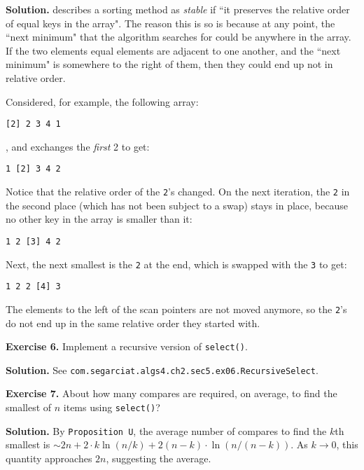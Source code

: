 \documentclass[12pt, a4paper]{article}
\newenvironment{ex}[2][Exercise]
{\par\medskip\noindent \textbf{#1 #2.}}
{\medskip}
\newenvironment{sol}[1][Solution]
{\par\medskip\noindent \textbf{#1.} }
{\medskip}
\begin{document}
	\begin{sol}
		\cite{sedgewick_wayne} describes a sorting method as \emph{stable}
		if ``it preserves the relative order of equal keys in the array".
		The reason this is so is because at any point, the ``next minimum"
		that the algorithm searches for could be anywhere in the array.
		If the two elements equal elements are adjacent to one another, and
		the ``next minimum" is somewhere to the right of them, then
		they could end up not in relative order.
		
		Considered, for example, the following array:
		\begin{lstlisting}[language={}]
[2] 2 3 4 1
		\end{lstlisting}, and exchanges the \emph{first} 2 to get:
		\begin{lstlisting}[language={}]
1 [2] 3 4 2
		\end{lstlisting}
		Notice that the relative order of the \texttt{2}'s changed. On
		the next iteration, the \texttt{2} in the second place (which
		has not been subject to a swap) stays in place, because no other
		key in the array is smaller than it:
		\begin{lstlisting}[language={}]
1 2 [3] 4 2
		\end{lstlisting}
		Next, the next smallest is the  \texttt{2} at the end, which is swapped
		with the \texttt{3} to get:
		\begin{lstlisting}[language={}]
1 2 2 [4] 3
		\end{lstlisting}
		The elements to the left of the scan pointers are not moved anymore,
		so the \texttt{2}'s do not end up in the same relative order they started
		with.
	\end{sol}
	\begin{ex}{6}
		Implement a recursive version of \texttt{select()}.
	\end{ex}
	\begin{sol}
		See \texttt{com.segarciat.algs4.ch2.sec5.ex06.RecursiveSelect}.
	\end{sol}
	\begin{ex}{7}
		About how many compares are required, on average, to find the smallest
		of $n$ items using \texttt{select()}?
	\end{ex}
	\begin{sol}
		By \texttt{Proposition U}, the average number of compares to find
		the $k$th smallest is $\sim 2n + 2\cdot k\ln (n/k) + 2(n - k)\cdot \ln(n/(n-k))$.
		As $k\to 0$, this quantity approaches $2n$, suggesting the average.
	\end{sol}
\end{document}
